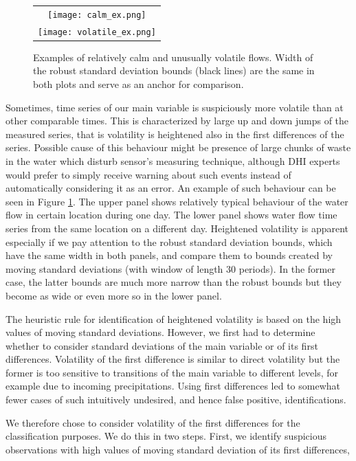 \documentclass[12pt,a4paper]{article}
\begin{document}
\begin{figure}[htbp]
    \centering
    \begin{tabular}{c}
        \texttt{[image: calm\_ex.png]} \\
        \texttt{[image: volatile\_ex.png]} \\
    \end{tabular}
    \caption{Examples of relatively calm and unusually volatile flows. Width of the robust standard deviation bounds (black lines) are the same in both plots and serve as an anchor for comparison. }
    \label{fig:volatile_ex}
\end{figure}

Sometimes, time series of our main variable is suspiciously more volatile than at other comparable times. This is characterized by large  up and down jumps of the measured series, that is volatility is heightened also in the first differences of the series. Possible cause of this behaviour might be presence of large chunks of waste in the water which disturb sensor's measuring technique, although DHI experts would prefer to simply receive warning about such events instead of automatically considering it as an error. An example of such behaviour can be seen in Figure \ref{fig:volatile_ex}. The upper panel shows relatively typical behaviour of the water flow in certain location during one day. The lower panel shows water flow time series from the same location on a different day. Heightened volatility is apparent especially if we pay attention to the robust standard deviation bounds, which have the same width in both panels, and compare them to bounds created by moving standard deviations (with window of length 30 periods). In the former case, the latter bounds are much more narrow than the robust bounds but they become as wide or even more so in the lower panel. 

The heuristic rule for identification of heightened volatility is based on the high values of moving standard deviations. However, we first had to determine whether to consider standard deviations of the main variable or of its first differences. Volatility of the first difference is similar to direct volatility but the former is too sensitive to transitions of the main variable to different levels, for example due to incoming precipitations. Using first differences led to somewhat fewer cases of such intuitively undesired, and hence false positive, identifications.  

We therefore chose to consider volatility of the first differences for the classification purposes. We do this in two steps. First, we identify suspicious observations with high values of moving standard deviation of its first differences,
\end{document}
